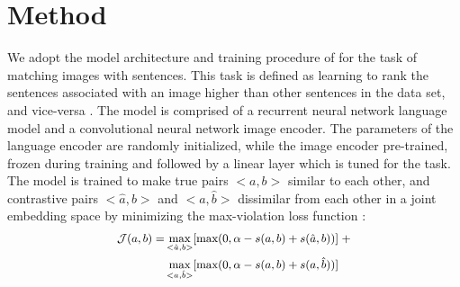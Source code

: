 \section{Method}


We adopt the model architecture and training procedure
of \citet{kadar2018conll} for the task of matching images with sentences. This task is defined as learning to rank the sentences associated with an image higher than other sentences in the data set, and vice-versa \cite{hodosh2013framing}. The model is comprised of 
a recurrent neural network language model and a 
convolutional neural network image encoder. 
The parameters of the 
language encoder are randomly initialized, while
the image encoder pre-trained, frozen during 
training and followed by a linear layer which is
tuned for the task.  
The model is trained to make true pairs $<a,b>$ 
similar to each other, and contrastive pairs
$<\hat{a},b>$ and 
$<a,\hat{b}>$ dissimilar from each other in a joint
embedding space by minimizing the max-violation loss function
\cite{faghri2017vse++}:
%
\begin{equation}
\small{
\label{eq:maxviol}
\begin{split}
\mathcal{J}(a, b) = &\max_{<\hat{a}, b>}[\text{max}(0, \alpha - s(a,b) + s(\hat{a}, b))] \;+ \\ &\max_{<a, \hat{b}>}[\text{max}(0, \alpha - s(a,b) + s(a, \hat{b}))]
\end{split}
}
\end{equation}


